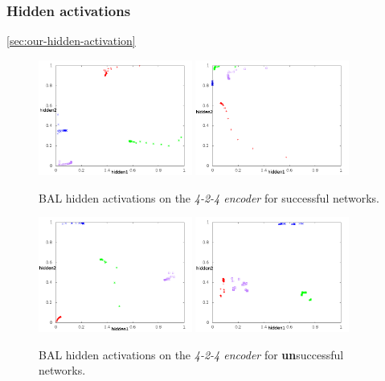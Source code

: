 \subsubsection{Hidden activations}
\ref{sec:our-hidden-activation}  


\begin{figure}[H]
  \centering
  \includegraphics[width=0.45\textwidth]{../presentation/img/nice.png}  %
  \includegraphics[width=0.45\textwidth]{../presentation/img/left_top.png}   %
  \caption{BAL hidden activations on the \emph{4-2-4 encoder} for successful networks.}
  \label{fig:results-hidden-activations-bal-good}
\end{figure}

\begin{figure}[H]
  \centering
  \includegraphics[width=0.45\textwidth]{../presentation/img/tazisko.png}   %
  \includegraphics[width=0.45\textwidth]{../presentation/img/non-convergent.png}   %
  \caption{BAL hidden activations on the \emph{4-2-4 encoder} for {\bf un}successful networks.}
  \label{fig:results-hidden-activations-bal-bad}
\end{figure}

